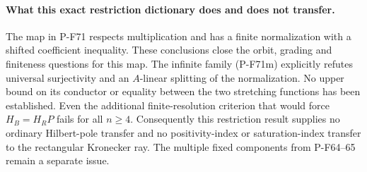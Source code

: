 \paragraph{What this exact restriction dictionary does and does not transfer.}
The map in P-F71 respects multiplication and has a finite
normalization with a shifted coefficient inequality.
These conclusions close the orbit, grading and finiteness
questions for this map.  The infinite family (P-F71m)
explicitly refutes universal surjectivity and an
$A$-linear splitting of the normalization.  No upper
bound on its conductor or equality between the two
stretching functions has been established.
Even the additional finite-resolution criterion that
would force $H_B=H_R P$ fails for all $n\ge4$.
Consequently this restriction result supplies no
ordinary Hilbert-pole transfer and no positivity-index
or saturation-index transfer to the rectangular
Kronecker ray.  The multiple fixed components from
P-F64--65 remain a separate issue.

